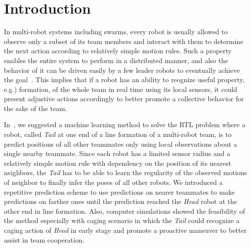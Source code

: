 \documentclass[letterpaper, 10 pt, conference]{ieeeconf}  %
\begin{document}
\begin{abstract}
	\end{abstract}



	\section{Introduction}
	\label{sec:intro}

	In multi-robot systems including swarms, every robot is usually allowed to observe
	only a subset of its team members and interact with them to determine the next action
	according to relatively simple motion rules.
	Such a property enables the entire system to perform in a distributed manner, and
	also the behavior of it can be driven easily by a few leader robots to
	eventually achieve the goal~\cite{CPR17, DGRSS17, EB16, Stern18}.
	This implies that if a robot has an ability to reognize useful property, e.g.) formation,
	of the whole team in real time using its local sensors,
	it could present adjustive actions accordingly to better promote a collective behavior
	for the sake of the team.

	In~\cite{CPR17}, we suggested a machine learning method to solve the
	RTL problem where a robot, called \emph{Tail} at one end of a line formation of
	a multi-robot team, is to predict positions of all other teammates only using local
	observations about a single nearby teammate. Since each robot has a limited sensor
	radius and a relatively simple motion rule with dependency
	on the position of its nearest neighbors,
	the \emph{Tail} has to be able to learn the regularity
	of the observed motions of neighbor to finally infer the poses of all other robots.
	We introduced a repetitive prediction scheme to use predictions on
	nearer teammates to make predictions on farther ones until the prediction
	reached the \emph{Head} robot at the other end in line formation.
	Also, computer simulations showed the feasibility of the method
	especially with caging scenario in which the \emph{Tail} could recognize a
	caging action of \emph{Head} in early stage and promote a proactive maneuver to
	better assist in team cooperation.
\end{document}

